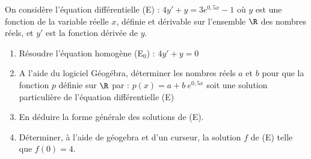 \begin{exercice_cours}{}

On considère l’équation différentielle (E) : $4y' + y = 3e^{0,5x}-1$ où $y$ est une fonction de la variable réelle $x$, définie et dérivable sur l’ensemble $\R$ des nombres réels, et $y'$ est la fonction dérivée de $y$.

\begin{enumerate}
	\item Résoudre l'équation homogène (E$_0$) : $4y'+y=0$

	\item A l’aide du logiciel Géogébra, déterminer les nombres réels $a$ et $b$ pour que la fonction $p$ définie sur $\R$ par : $p(x) = a + b~e^{0,5x}$ soit une solution particulière de l'équation différentielle (E)
	
	\item En déduire la forme générale des solutions de (E).

	\item Déterminer, à l'aide de géogebra et d'un curseur, la solution $f$ de (E) telle que $f(0)=4$.

\end{enumerate}
\end{exercice_cours}